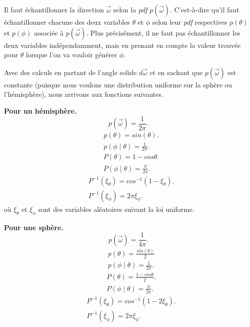 Il faut échantillonner la direction $\overrightarrow{\omega}$ selon la \textit{pdf} $p(\overrightarrow{\omega})$. C'est-à-dire qu'il faut échantillonner chacune des deux variables $\theta$ et $\phi$ selon leur \textit{pdf} respectives $p(\theta)$ et $p(\phi)$ associée à $p(\overrightarrow{\omega})$. Plus précisément, il ne faut pas échantillonner les deux variables indépendamment, mais en prenant en compte la valeur trouvée pour $\theta$ lorsque l'on va vouloir générer $\phi$.\par
Avec des calculs en partant de l'angle solide $d\overrightarrow{\omega}$ et en sachant que $p(\overrightarrow{\omega})$ est constante (puisque nous voulons une distribution uniforme sur la sphère ou l'hémisphère), nous arrivons aux fonctions suivantes.\newline\par
\textbf{Pour un hémisphère.}
\large \begin{equation}
    p(\overrightarrow{\omega}) = \frac{1}{2\pi}
.\end{equation}
\begin{align}
    &p(\theta) = sin(\theta) .\\
    &p(\phi \mid \theta) = \frac{1}{2\pi}
.\end{align}
\begin{align}
    &P(\theta) = 1 - cos\theta .\\
    &P(\phi \mid \theta) = \frac{\phi}{2\pi}
.\end{align}
\begin{align}
    &P^{-1}(\xi_{\theta}) = cos^{-1}(1 - \xi_{\theta}) .\\
    &P^{-1}(\xi_{\phi}) = 2 \pi \xi_{\phi}
.\end{align} \normalsize
où $\xi_{\theta}$ et $\xi_{\phi}$ sont des variables aléatoires suivant la loi uniforme.\newline\par

\textbf{Pour une sphère.}
\large
\begin{equation}
    p(\overrightarrow{\omega}) = \frac{1}{4\pi}
.\end{equation}
\begin{align}
    &p(\theta) = \frac{sin(\theta)}{2} \\
    &p(\phi \mid \theta) = \frac{1}{2\pi}
.\end{align}
\begin{align}
    &P(\theta) = \frac{1 - cos\theta}{2} .\\
    &P(\phi \mid \theta) = \frac{\phi}{2\pi}
.\end{align}
\begin{align}
    &P^{-1}(\xi_{\theta}) = cos^{-1}(1 - 2\xi_{\theta}) .\\
    &P^{-1}(\xi_{\phi}) = 2 \pi \xi_{\phi}
.\end{align} \normalsize